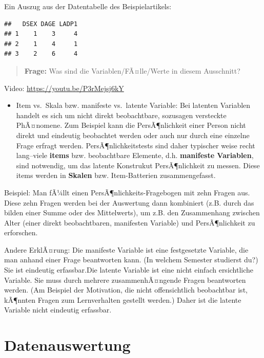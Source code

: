 \documentclass[
]{book}
\providecommand{\tightlist}{%
  \setlength{\itemsep}{0pt}\setlength{\parskip}{0pt}}
\begin{document}
Ein Auszug aus der Datentabelle des Beispielartikels:

\begin{verbatim}
##   DSEX DAGE LADP1
## 1    1    3     4
## 2    1    4     1
## 3    2    6     4
\end{verbatim}

\begin{quote}
\textbf{Frage:} Was sind die Variablen/FÃ¤lle/Werte in diesem Ausschnitt?
\end{quote}

Video: \url{https://youtu.be/P3rMejsj6kY}

\begin{itemize}
\tightlist
\item
  Item vs.~Skala bzw. manifeste vs.~latente Variable: Bei latenten Variablen handelt es sich um nicht direkt beobachtbare, sozusagen versteckte PhÃ¤nomene. Zum Beispiel kann die PersÃ¶nlichkeit einer Person nicht direkt und eindeutig beobachtet werden oder auch nur durch eine einzelne Frage erfragt werden. PersÃ¶nlichkeitstests sind daher typischer weise recht lang--viele \textbf{items} bzw. beobachtbare Elemente, d.h. \textbf{manifeste Variablen}, sind notwendig, um das latente Konstrukut PersÃ¶nlichkeit zu messen. Diese items werden in \textbf{Skalen} bzw. Item-Batterien zusammengefasst.
\end{itemize}

Beispiel: Man fÃ¼llt einen PersÃ¶nlichkeits-Fragebogen mit zehn Fragen aus. Diese zehn Fragen werden bei der Auswertung dann kombiniert (z.B. durch das bilden einer Summe oder des Mittelwerts), um z.B. den Zusammenhang zwischen Alter (einer direkt beobachtbaren, manifesten Variable) und PersÃ¶nlichkeit zu erforschen.

Andere ErklÃ¤rung: Die manifeste Variable ist eine festgesetzte Variable, die man anhand einer Frage beantworten kann. (In welchem Semester studierst du?) Sie ist eindeutig erfassbar.Die latente Variable ist eine nicht einfach ersichtliche Variable. Sie muss durch mehrere zusammenhÃ¤ngende Fragen beantworten werden. (Am Beispiel der Motivation, die nicht offensichtlich beobachtbar ist, kÃ¶nnten Fragen zum Lernverhalten gestellt werden.) Daher ist die latente Variable nicht eindeutig erfassbar.

\hypertarget{datenauswertung}{%
\section{Datenauswertung}\label{datenauswertung}}
\end{document}
